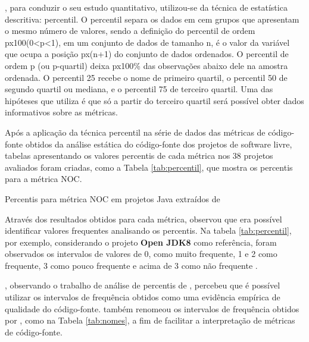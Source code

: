 , para conduzir o seu estudo quantitativo, utilizou-se da técnica de estatística descritiva: percentil. O percentil separa os dados em cem grupos que apresentam o mesmo número de valores, sendo a definição do percentil de ordem px100(0<p<1), em um conjunto de dados de tamanho n, é o valor da variável que ocupa a posição px(n+1) do conjunto de dados ordenados. O percentil de ordem p (ou p-quartil) deixa px100\% das observações abaixo dele na amostra ordenada. O percentil 25 recebe o nome de primeiro quartil, o percentil 50 de segundo quartil ou mediana, e o percentil 75 de terceiro quartil. Uma das hipóteses que  utiliza é que só a partir do terceiro quartil será possível obter dados informativos sobre as métricas.

Após a aplicação da técnica percentil na série de dados das métricas de código-fonte obtidos da análise estática do código-fonte dos projetos de software livre, tabelas apresentando os valores percentis de cada métrica nos 38 projetos avaliados foram criadas, como a Tabela \ref{tab:percentil}, que mostra os percentis para a métrica NOC.  
	
	\begin{table}[!ht]
	\begin{center}
	
	 
	\caption{Percentis para métrica NOC em projetos Java extraídos de  
	}
	\label{tab:percentil}
	\end{center}
	\end{table}	
	\FloatBarrier	

Através dos resultados obtidos para cada métrica,  observou que era possível identificar valores frequentes analisando os percentis. Na tabela \ref{tab:percentil}, por exemplo, considerando o projeto \textbf{Open JDK8} como referência, foram observados os intervalos de valores de 0, como muito frequente, 1 e 2 como frequente, 3 como pouco frequente e acima de 3 como não frequente \cite{Meirelles2013}. 

, observando o trabalho de análise de percentis de , percebeu que é possível utilizar os intervalos de frequência obtidos como uma evidência empírica de qualidade do código-fonte.  também renomeou os intervalos de frequência obtidos por , como na Tabela \ref{tab:nomes}, a fim de facilitar a interpretação de métricas de código-fonte. 

